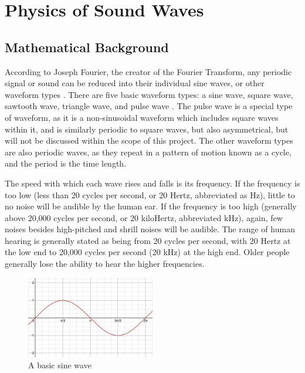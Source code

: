 \chapter{Physics of Sound Waves}\label{chapter:theory}

\section{Mathematical Background}\label{section:waveforms}
According to Joseph Fourier, the creator of the Fourier Transform, any periodic signal or sound can be reduced into their individual sine waves, or other waveform types \cite{Broughton_Bryan_2008}. There are five basic waveform types: a sine wave, square wave, sawtooth wave, triangle wave, and pulse wave \cite{Winer_2018}. The pulse wave is a special type of waveform, as it is a non-sinusoidal waveform which includes square waves within it, and is similarly periodic to square waves, but also asymmetrical, but will not be discussed within the scope of this project. The other waveform types are also periodic waves, as they repeat in a pattern of motion known as a cycle, and the period is the time length.

The speed with which each wave rises and falls is its frequency. If the frequency is too low (less than 20 cycles per second, or 20 Hertz, abbreviated as Hz), little to no noise will be audible by the human ear. If the frequency is too high (generally above 20,000 cycles per second, or 20 kiloHertz, abbreviated kHz), again, few noises besides high-pitched and shrill noises will be audible. The range of human hearing is generally stated as being from 20 cycles per second, with 20 Hertz at the low end to 20,000 cycles per second (20 kHz) at the high end. Older people generally lose the ability to hear the higher frequencies.

\begin{figure}
	\centering
	\includegraphics[width=0.5\textwidth]{figures/sine-wave-form.png}
	\caption{A basic sine wave}
	\label{fig:basic-sine-wave}
\end{figure}

